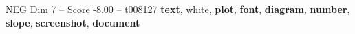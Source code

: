 \begin{textsample}{NEG Dim 7 – Score -8.00 – t008127}  \label{ex:f7_neg_012}
\textbf{text}, white, \textbf{plot}, \textbf{font}, \textbf{diagram}, \textbf{number}, \textbf{slope}, \textbf{screenshot}, \textbf{document}

\end{textsample}
